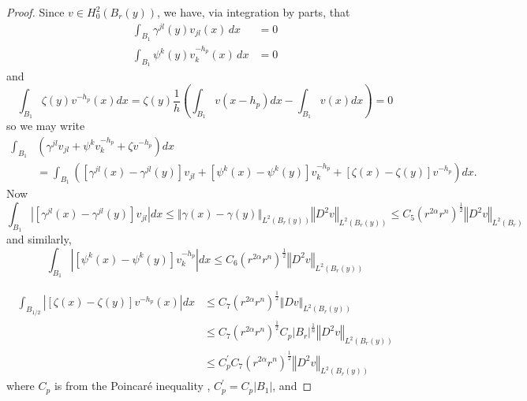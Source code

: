 \documentclass[12pt,leqno]{amsart}%
\theoremstyle{plain}
\numberwithin{equation}{section}
\theoremstyle{definition}
\begin{document}
\begin{proof}
Since $v\in H_{0}^{2}(B_{r}(y))$, we have, via integration by parts, that
\begin{align*}
\int_{B_{1}}\gamma^{jl}(y)v_{jl}(x)\,dx  &  =0\\
\int_{B_{1}}\psi^{k}(y)v_{k}^{-h_{p}}(x)\,dx  &  =0
\end{align*}
and
\[
\int_{B_{1}}\zeta(y)v^{-h_{p}}(x)dx =\zeta(y)\frac{1}{h}\left(  \int_{B_{1}%
}v(x-h_{p})dx-\int_{B_{1}}v(x)dx\right)  =0
\]
so we may write%
\begin{align*}
\int_{B_{1}}  &  \left(  \gamma^{jl}v_{jl}+\psi^{k}v_{k}^{-h_{p}}+\zeta
v^{-h_{p}}\right)  dx\\
&  =\int_{B_{1}}\left(  \left[  \gamma^{jl}(x)-\gamma^{jl}(y)\right]
v_{jl}+\left[  \psi^{k}(x)-\psi^{k}(y)\right]  v_{k}^{-h_{p}}+\left[
\zeta(x)-\zeta(y)\right]  v^{-h_{p}}\right)  dx.
\end{align*}
Now
\[
\int_{B_{1}}\left\vert [\gamma^{jl}(x)-\gamma^{jl}(y)]v_{jl}\right\vert
dx\leq\left\Vert \gamma(x)-\gamma(y)\right\Vert _{L^{2}(B_{r}(y))}\left\Vert
D^{2}v\right\Vert _{L^{2}(B_{r}(y))}\leq C_{5}\left(  r^{2\alpha}r^{n}\right)
^{\frac{1}{2}}\left\Vert D^{2}v\right\Vert _{L^{2}(B_{r})}%
\]
and similarly,%
\[
\int_{B_{1}}\left\vert [\psi^{k}(x)-\psi^{k}(y)]v_{k}^{-h_{p}}\right\vert
dx\leq C_{6}\left( r^{2\alpha}r^{n}\right)^{\frac{1}{2}}\left\Vert D^{2}%
v\right\Vert _{L^{2}(B_{r}(y))}%
\]


\begin{comment}
{\color{blue}
\begin{align}
\int_{B_{1/2}}\left| [\zeta(x)-\zeta(0)] v^{-h_{p}}(x)dx\right|
=\int_{B_{1/2}}\left| [\zeta(x)-\zeta(0)]\int_{0}^{1}\left(  -D_{p}%
v(x-th_{p})\right) dt\right|  dx\nonumber\\
\leq\|\zeta(x)-\zeta(0)\|_{L^{2}(B_{r})}\cdot\|Dv\|_{L^{2}(B_{r})}\nonumber\\
\leq C_{7}r^{\frac}{n+2\alpha}{2}\cdot C_{p}|B_{r}|^{\frac{1}{n}}\left\Vert
D^{2}v\right\Vert _{L^{2}(B_{r})}\nonumber\\
\leq C^{\prime}_{p}C_{7}\left(  r^{2\alpha}r^{n}\right)  ^{1/2}\left\Vert
D^{2}v\right\Vert _{L^{2}(B_{r})}\nonumber
\end{align}
where $C_{p}$ is from the Poincare inequality \cite[(7.44)]{GT} and
$C_{p}^{\prime}=C_{p}|B_{1}|$. }
\end{comment}
%

\begin{align}
\int_{B_{1/2}}\left\vert [\zeta(x)-\zeta(y)]v^{-h_{p}}(x)\right\vert dx &\leq
C_{7}\left( r^{2\alpha}r^{n}\right)^{\frac{1}{2}}\Vert Dv\Vert_{L^{2}(B_{r}(y)
)}\nonumber\\
&\leq C_{7}\left( r^{2\alpha}r^{n}\right)^{\frac{1}{2}} C_{p}|B_{r}|^{\frac{1}{n}%
}\left\Vert D^{2}v\right\Vert _{L^{2}(B_{r}(y))}\nonumber\\
&\leq C^{\prime}_{p}C_{7}\left(  r^{2\alpha}r^{n}\right)^{\frac{1}{2}}\left\Vert
D^{2}v\right\Vert _{L^{2}(B_{r}(y))}\nonumber
\end{align}
where $C_{p}$ is from the Poincar\'{e} inequality \cite[(7.44)]{GT},
$C_{p}^{\prime}=C_{p}|B_{1}|$, and


\end{proof}
\end{document}
